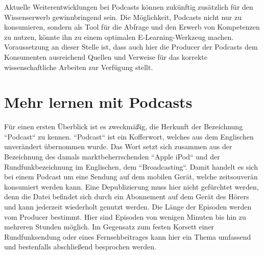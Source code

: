 \documentclass[11pt,a4paper]{scrreprt}
\begin{document}
Aktuelle Weiterentwicklungen bei Podcasts können zukünftig zusätzlich für den Wissenserwerb gewinnbringend sein. Die Möglichkeit, Podcasts nicht nur zu konsumieren, sondern als Tool für die Abfrage und den Erwerb von Kompetenzen zu nutzen, könnte ihn zu einem optimalen E-Learning-Werkzeug machen. Voraussetzung an dieser Stelle ist, dass auch hier die Producer der Podcasts dem Konsumenten ausreichend Quellen und Verweise für das korrekte wissenschaftliche Arbeiten zur Verfügung stellt.

\chapter{Mehr lernen mit Podcasts}
\thispagestyle{fancy}
Für einen ersten Überblick ist es zweckmäßig, die Herkunft der Bezeichnung ``Podcast`` zu kennen. ``Podcast`` ist ein Kofferwort, welches aus dem Englischen unverändert übernommen wurde. Das Wort setzt sich zusammen aus der Bezeichnung des damals marktbeherrschenden ``Apple iPod`` und der Rundfunkbezeichnung im Englischen, dem ``Broadcasting``. Damit handelt es sich bei einem Podcast um eine Sendung auf dem mobilen Gerät, welche zeitsouverän konsumiert werden kann. Eine Depublizierung muss hier nicht gefürchtet werden, denn die Datei befindet sich durch ein Abonnement auf dem Gerät des Hörers und kann jederzeit wiederholt genutzt werden. Die Länge der Episoden werden vom Producer bestimmt. Hier sind Episoden von wenigen Minuten bis hin zu mehreren Stunden möglich. Im Gegensatz zum festen Korsett einer Rundfunksendung oder eines Fernsehbeitrages kann hier ein Thema umfassend und bestenfalls abschließend besprochen werden. 
\end{document}
